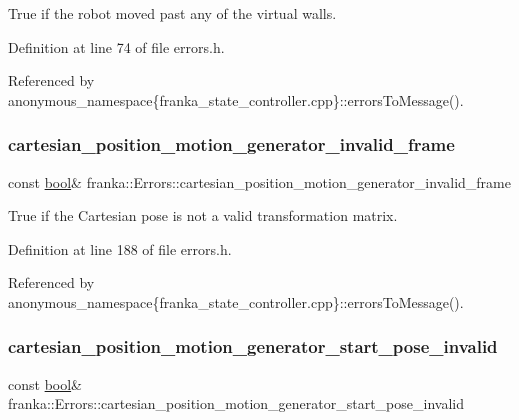True if the robot moved past any of the virtual walls. 

Definition at line 74 of file errors.\+h.



Referenced by anonymous\+\_\+namespace\{franka\+\_\+state\+\_\+controller.\+cpp\}\+::errors\+To\+Message().

\mbox{\label{structfranka_1_1Errors_aa1952c6da2f81578861a19b947c97b85}} 
\subsubsection{\texorpdfstring{cartesian\+\_\+position\+\_\+motion\+\_\+generator\+\_\+invalid\+\_\+frame}{cartesian\_position\_motion\_generator\_invalid\_frame}}
{\footnotesize\ttfamily const \hyperlink{classbool}{bool}\& franka\+::\+Errors\+::cartesian\+\_\+position\+\_\+motion\+\_\+generator\+\_\+invalid\+\_\+frame}

True if the Cartesian pose is not a valid transformation matrix. 

Definition at line 188 of file errors.\+h.



Referenced by anonymous\+\_\+namespace\{franka\+\_\+state\+\_\+controller.\+cpp\}\+::errors\+To\+Message().

\mbox{\label{structfranka_1_1Errors_aa910fad4992b91be1ea1c321ee9b7a1e}} 
\subsubsection{\texorpdfstring{cartesian\+\_\+position\+\_\+motion\+\_\+generator\+\_\+start\+\_\+pose\+\_\+invalid}{cartesian\_position\_motion\_generator\_start\_pose\_invalid}}
{\footnotesize\ttfamily const \hyperlink{classbool}{bool}\& franka\+::\+Errors\+::cartesian\+\_\+position\+\_\+motion\+\_\+generator\+\_\+start\+\_\+pose\+\_\+invalid}

